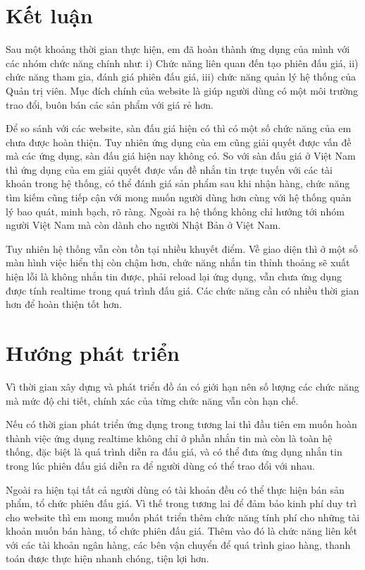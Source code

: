 \documentclass[../DoAn.tex]{subfiles}
\begin{document}
\section{Kết luận}
Sau một khoảng thời gian thực hiện, em đã hoàn thành ứng dụng của mình với các nhóm chức năng chính như: i) Chức năng liên quan đến tạo phiên đấu giá, ii) chức năng tham gia, đánh giá phiên đấu giá, iii) chức năng quản lý hệ thống của Quản trị viên. Mục đích chính của website là giúp người dùng có một môi trường trao đổi, buôn bán các sản phẩm với giá rẻ hơn. 

Để so sánh với các website, sàn đấu giá hiện có thì có một số chức năng của em chưa được hoàn thiện. Tuy nhiên ứng dụng của em cũng giải quyết được vấn đề mà các ứng dụng, sàn đấu giá hiện nay không có. So với sàn đấu giá ở Việt Nam thì ứng dụng của em giải quyết được vấn đề nhắn tin trực tuyến với các tài khoản trong hệ thống, có thể đánh giá sản phẩm sau khi nhận hàng, chức năng tìm kiếm cũng tiếp cận với mong muốn người dùng hơn cùng với hệ thống quản lý bao quát, minh bạch, rõ ràng. Ngoài ra hệ thống không chỉ hướng tới nhóm người Việt Nam mà còn dành cho người Nhật Bản ở Việt Nam.

Tuy nhiên hệ thống vẫn còn tồn tại nhiều khuyết điểm. Về giao diện thì ở một số màn hình việc hiển thị còn chậm hơn, chức năng nhắn tin thỉnh thoảng sẽ xuất hiện lỗi là không nhắn tin được, phải reload lại ứng dụng, vẫn chưa ứng dụng được tính realtime trong quá trình đấu giá. Các chức năng cần có nhiều thời gian hơn để hoàn thiện tốt hơn.
\section{Hướng phát triển}
Vì thời gian xây dựng và phát triển đồ án có giới hạn nên số lượng các chức năng mà mức độ chi tiết, chính xác của từng chức năng vẫn còn hạn chế. 

Nếu có thời gian phát triển ứng dụng trong tương lai thì đầu tiên em muốn hoàn thành việc ứng dụng realtime không chỉ ở phần nhắn tin mà còn là toàn hệ thống, đặc biệt là quá trình diễn ra đấu giá, và có thể đưa ứng dụng nhắn tin trong lúc phiên đấu giá diễn ra để người dùng có thể trao đổi với nhau. 

Ngoài ra hiện tại tất cả người dùng có tài khoản đều có thể thực hiện bán sản phẩm, tổ chức phiên đấu giá. Vì thế trong tương lai để đảm bảo kinh phí duy trì cho website thì em mong muốn phát triển thêm chức năng tính phí cho những tài khoản muốn bán hàng, tổ chức phiên đấu giá. Thêm vào đó là chức năng liên kết với các tài khoản ngân hàng, các bên vận chuyển để quá trình giao hàng, thanh toán được thực hiện nhanh chóng, tiện lợi hơn. 
\end{document}
